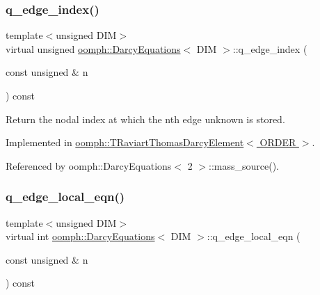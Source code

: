 \mbox{\label{classoomph_1_1DarcyEquations_a2df2b20433444d1c8d3a9b6b9525c1ed}} 
\subsubsection{\texorpdfstring{q\+\_\+edge\+\_\+index()}{q\_edge\_index()}}
{\footnotesize\ttfamily template$<$unsigned D\+IM$>$ \\
virtual unsigned \hyperlink{classoomph_1_1DarcyEquations}{oomph\+::\+Darcy\+Equations}$<$ D\+IM $>$\+::q\+\_\+edge\+\_\+index (\begin{DoxyParamCaption}\item[{const unsigned \&}]{n }\end{DoxyParamCaption}) const\hspace{0.3cm}{\ttfamily [pure virtual]}}



Return the nodal index at which the nth edge unknown is stored. 



Implemented in \hyperlink{classoomph_1_1TRaviartThomasDarcyElement_a5c0de6706bca0a9b006832dd8df30b81}{oomph\+::\+T\+Raviart\+Thomas\+Darcy\+Element$<$ O\+R\+D\+E\+R $>$}.



Referenced by oomph\+::\+Darcy\+Equations$<$ 2 $>$\+::mass\+\_\+source().

\mbox{\label{classoomph_1_1DarcyEquations_a559ad66d750c27f54ad342f0c8815e74}} 
\subsubsection{\texorpdfstring{q\+\_\+edge\+\_\+local\+\_\+eqn()}{q\_edge\_local\_eqn()}}
{\footnotesize\ttfamily template$<$unsigned D\+IM$>$ \\
virtual int \hyperlink{classoomph_1_1DarcyEquations}{oomph\+::\+Darcy\+Equations}$<$ D\+IM $>$\+::q\+\_\+edge\+\_\+local\+\_\+eqn (\begin{DoxyParamCaption}\item[{const unsigned \&}]{n }\end{DoxyParamCaption}) const\hspace{0.3cm}{\ttfamily [pure virtual]}}



